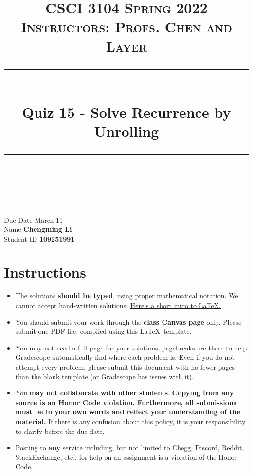 \documentclass[11pt]{article}
\title{
\normalfont \normalsize 
\textsc{CSCI 3104 Spring 2022 \\ 
Instructors: Profs. Chen and Layer} \\
[10pt] 
\rule{\linewidth}{0.5pt} \\[6pt] 
\huge Quiz 15 - Solve Recurrence by Unrolling \\
\rule{\linewidth}{2pt}  \\[10pt]
}
\date{}
\theoremstyle{definition}
\theoremstyle{definition}
\theoremstyle{definition}
\begin{document}

\maketitle


\noindent
Due Date \dotfill March 11 \\
Name \dotfill \textbf{Chengming Li} \\
Student ID \dotfill \textbf{109251991} \\


\tableofcontents

\section{Instructions}
 \begin{itemize}
	\item The solutions \textbf{should be typed}, using proper mathematical notation. We cannot accept hand-written solutions. \href{http://ece.uprm.edu/~caceros/latex/introduction.pdf}{Here's a short intro to \LaTeX.}
	\item You should submit your work through the \textbf{class Canvas page} only. Please submit one PDF file, compiled using this \LaTeX \ template.
	\item You may not need a full page for your solutions; pagebreaks are there to help Gradescope automatically find where each problem is. Even if you do not attempt every problem, please submit this document with no fewer pages than the blank template (or Gradescope has issues with it).

	\item You \textbf{may not collaborate with other students}. \textbf{Copying from any source is an Honor Code violation. Furthermore, all submissions must be in your own words and reflect your understanding of the material.} If there is any confusion about this policy, it is your responsibility to clarify before the due date. 

	\item Posting to \textbf{any} service including, but not limited to Chegg, Discord, Reddit, StackExchange, etc., for help on an assignment is a violation of the Honor Code.
\end{itemize}
\end{document}
